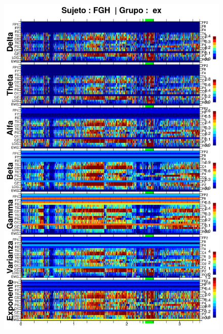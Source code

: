 \begin{figure}
\centering
\includegraphics[width=0.9\linewidth]
{./img_resultados/FGHSUE_espectral_total.png} 
\end{figure}
